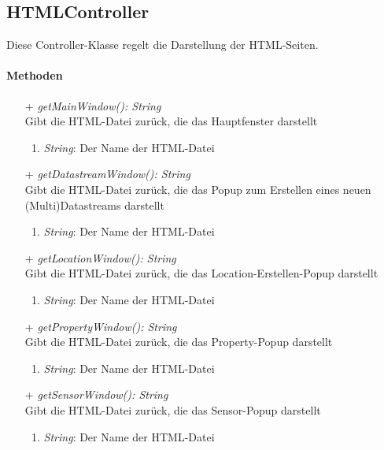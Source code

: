 \subsection{HTMLController}
Diese Controller-Klasse regelt die Darstellung der HTML-Seiten.


\paragraph{Methoden}
\begin{itemize}
	\item[+] \textit{ getMainWindow(): String } \\
	Gibt die HTML-Datei zurück, die das Hauptfenster darstellt
	\begin{enumerate}[$\circ$]
		\item \textit{String}: Der Name der HTML-Datei
	\end{enumerate}

	\item[+] \textit{ getDatastreamWindow(): String } \\
	Gibt die HTML-Datei zurück, die das Popup zum Erstellen eines neuen (Multi)Datastreams darstellt
	\begin{enumerate}[$\circ$]
		\item \textit{String}: Der Name der HTML-Datei
	\end{enumerate}

	\item[+] \textit{ getLocationWindow(): String } \\
	Gibt die HTML-Datei zurück, die das Location-Erstellen-Popup darstellt
	\begin{enumerate}[$\circ$]
		\item \textit{String}: Der Name der HTML-Datei
	\end{enumerate}

	\item[+] \textit{ getPropertyWindow(): String } \\
	Gibt die HTML-Datei zurück, die das Property-Popup darstellt
	\begin{enumerate}[$\circ$]
		\item \textit{String}: Der Name der HTML-Datei
	\end{enumerate}

	\item[+] \textit{ getSensorWindow(): String } \\
	Gibt die HTML-Datei zurück, die das Sensor-Popup darstellt
	\begin{enumerate}[$\circ$]
		\item \textit{String}: Der Name der HTML-Datei
	\end{enumerate}


\end{itemize}
